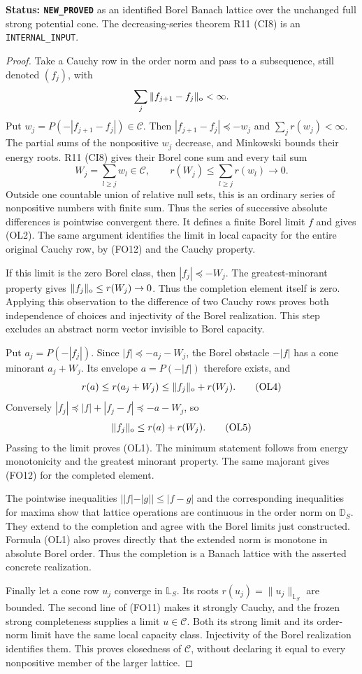 \noindent\textbf{Status: \texttt{NEW\_PROVED}} as an
identified Borel Banach lattice over the unchanged full
strong potential cone.  The decreasing-series theorem R11
\textup{(CI8)} is an \texttt{INTERNAL\_INPUT}.

\begin{proof}
Take a Cauchy row in the order norm and pass to a subsequence,
still denoted $(f_j)$, with
\[
                 \sum_j\|f_{j+1}-f_j\|_{\rm o}<\infty.
\]
Put $w_j=P(-|f_{j+1}-f_j|)\in\mathscr C$.  Then
$|f_{j+1}-f_j|\preceq-w_j$ and
$\sum_jr(w_j)<\infty$.  The partial sums of the nonpositive
$w_j$ decrease, and Minkowski bounds their energy roots.
R11 \textup{(CI8)} gives their Borel cone sum and every
tail sum
\[
 W_j=\sum_{l\ge j}w_l\in\mathscr C,\qquad
 r(W_j)\le\sum_{l\ge j}r(w_l)\longrightarrow0.
 \tag{OL3}
\]
Outside one countable union of relative null sets, this is
an ordinary series of nonpositive numbers with finite sum.
Thus the series of successive absolute differences is
pointwise convergent there.  It defines a finite Borel
limit $f$ and gives \textup{(OL2)}.  The same argument
identifies the limit in local capacity for the entire
original Cauchy row, by \textup{(FO12)} and the Cauchy
property.

If this limit is the zero Borel class, then
$|f_j|\preceq-W_j$.  The greatest-minorant property gives
$\|f_j\|_{\rm o}\le r(W_j)\to0$.  Thus the completion
element itself is zero.  Applying this observation to
the difference of two Cauchy rows proves both independence
of choices and injectivity of the Borel realization.  This
step excludes an abstract norm vector invisible to Borel
capacity.

Put $a_j=P(-|f_j|)$.  Since
$|f|\preceq-a_j-W_j$, the Borel obstacle $-|f|$ has
a cone minorant $a_j+W_j$.  Its envelope $a=P(-|f|)$
therefore exists, and
\[
 r(a)\le r(a_j+W_j)\le\|f_j\|_{\rm o}+r(W_j).
 \tag{OL4}
\]
Conversely $|f_j|\preceq|f|+|f_j-f|\preceq-a-W_j$,
so
\[
                  \|f_j\|_{\rm o}\le r(a)+r(W_j).
 \tag{OL5}
\]
Passing to the limit proves \textup{(OL1)}.  The minimum
statement follows from energy monotonicity and the greatest
minorant property.  The same majorant gives
\textup{(FO12)} for the completed element.

The pointwise inequalities
$||f|-|g||\le|f-g|$ and the corresponding inequalities
for maxima show that lattice operations are continuous
in the order norm on $\mathbb D_S$.  They extend to the
completion and agree with the Borel limits just constructed.
Formula \textup{(OL1)} also proves directly that the extended
norm is monotone in absolute Borel order.  Thus the completion
is a Banach lattice with the asserted concrete realization.

Finally let a cone row $u_j$ converge in $\mathbb L_S$.
Its roots $r(u_j)=\|u_j\|_{\mathbb L_S}$ are bounded.
The second line of \textup{(FO11)} makes it strongly
Cauchy, and the frozen strong completeness supplies a
limit $u\in\mathscr C$.  Both its strong limit and its
order-norm limit have the same local capacity class.
Injectivity of the Borel realization identifies them.
This proves closedness of $\mathscr C$, without declaring
it equal to every nonpositive member of the larger lattice.
\end{proof}

